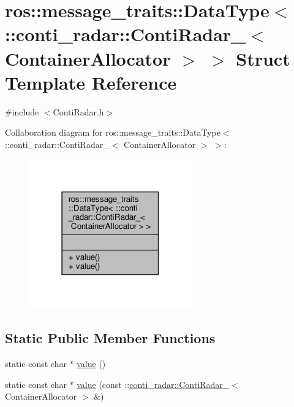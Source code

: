 \hypertarget{structros_1_1message__traits_1_1DataType_3_01_1_1conti__radar_1_1ContiRadar___3_01ContainerAllocator_01_4_01_4}{}\section{ros\+:\+:message\+\_\+traits\+:\+:Data\+Type$<$ \+:\+:conti\+\_\+radar\+:\+:Conti\+Radar\+\_\+$<$ Container\+Allocator $>$ $>$ Struct Template Reference}
\label{structros_1_1message__traits_1_1DataType_3_01_1_1conti__radar_1_1ContiRadar___3_01ContainerAllocator_01_4_01_4}


{\ttfamily \#include $<$Conti\+Radar.\+h$>$}



Collaboration diagram for ros\+:\+:message\+\_\+traits\+:\+:Data\+Type$<$ \+:\+:conti\+\_\+radar\+:\+:Conti\+Radar\+\_\+$<$ Container\+Allocator $>$ $>$\+:\nopagebreak
\begin{figure}[H]
\begin{center}
\leavevmode
\includegraphics[width=198pt]{d7/d7a/structros_1_1message__traits_1_1DataType_3_01_1_1conti__radar_1_1ContiRadar___3_01ContainerAllocator_01_4_01_4__coll__graph}
\end{center}
\end{figure}
\subsection*{Static Public Member Functions}
\begin{DoxyCompactItemize}
\item 
static const char $\ast$ \hyperlink{structros_1_1message__traits_1_1DataType_3_01_1_1conti__radar_1_1ContiRadar___3_01ContainerAllocator_01_4_01_4_a4ee7d8edfaeca1b42d76a5bf2bc7a71b}{value} ()
\item 
static const char $\ast$ \hyperlink{structros_1_1message__traits_1_1DataType_3_01_1_1conti__radar_1_1ContiRadar___3_01ContainerAllocator_01_4_01_4_a92d9375cf980237ffa095ef3c07a7d01}{value} (const \+::\hyperlink{structconti__radar_1_1ContiRadar__}{conti\+\_\+radar\+::\+Conti\+Radar\+\_\+}$<$ Container\+Allocator $>$ \&)
\end{DoxyCompactItemize}


